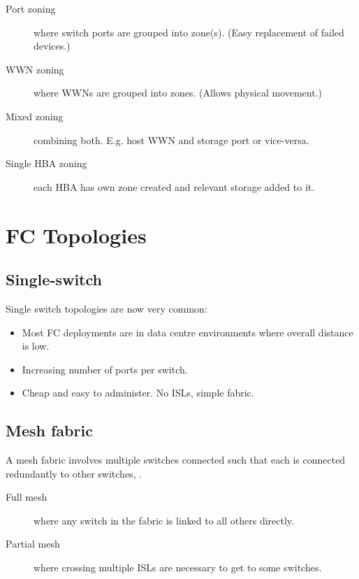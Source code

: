 \begin{description}
\item[Port zoning]
where switch ports are grouped into zone(s). (Easy replacement of failed
devices.)
\item[WWN zoning]
where WWNs are grouped into zones. (Allows physical movement.)
\item[Mixed zoning]
combining both. E.g. host WWN and storage port or vice-versa.
\item[Single HBA zoning]
each HBA has own zone created and relevant storage added to it.
\end{description}


\section{FC Topologies}
\label{sec:fc-topologies}

\subsection{Single-switch}
\label{sec:single-switch}

Single switch topologies are now very common:

\begin{itemize}
\item
  Most FC deployments are in data centre environments where overall
  distance is low.
\item
  Increasing number of ports per switch.
\item
  Cheap and easy to administer. No ISLs, simple fabric.
\end{itemize}

\subsection{Mesh fabric}
\label{sec:mesh-fabric}

A mesh fabric involves multiple switches connected such that each is
connected redundantly to other switches, .


\begin{description}
\item[Full mesh]
where any switch in the fabric is linked to all others directly.
\item[Partial mesh]
where crossing multiple ISLs are necessary to get to some switches.
\end{description}

